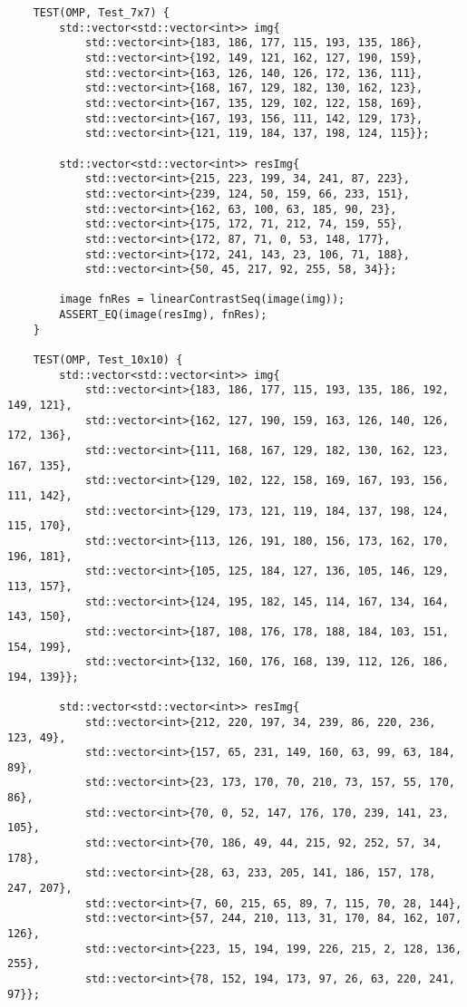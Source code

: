 \documentclass[14pt, russian]{extarticle}
\begin{document}
\begin{lstlisting}
	TEST(OMP, Test_7x7) {
		std::vector<std::vector<int>> img{
			std::vector<int>{183, 186, 177, 115, 193, 135, 186},
			std::vector<int>{192, 149, 121, 162, 127, 190, 159},
			std::vector<int>{163, 126, 140, 126, 172, 136, 111},
			std::vector<int>{168, 167, 129, 182, 130, 162, 123},
			std::vector<int>{167, 135, 129, 102, 122, 158, 169},
			std::vector<int>{167, 193, 156, 111, 142, 129, 173},
			std::vector<int>{121, 119, 184, 137, 198, 124, 115}};
		
		std::vector<std::vector<int>> resImg{
			std::vector<int>{215, 223, 199, 34, 241, 87, 223},
			std::vector<int>{239, 124, 50, 159, 66, 233, 151},
			std::vector<int>{162, 63, 100, 63, 185, 90, 23},
			std::vector<int>{175, 172, 71, 212, 74, 159, 55},
			std::vector<int>{172, 87, 71, 0, 53, 148, 177},
			std::vector<int>{172, 241, 143, 23, 106, 71, 188},
			std::vector<int>{50, 45, 217, 92, 255, 58, 34}};
		
		image fnRes = linearContrastSeq(image(img));
		ASSERT_EQ(image(resImg), fnRes);
	}
	
	TEST(OMP, Test_10x10) {
		std::vector<std::vector<int>> img{
			std::vector<int>{183, 186, 177, 115, 193, 135, 186, 192, 149, 121},
			std::vector<int>{162, 127, 190, 159, 163, 126, 140, 126, 172, 136},
			std::vector<int>{111, 168, 167, 129, 182, 130, 162, 123, 167, 135},
			std::vector<int>{129, 102, 122, 158, 169, 167, 193, 156, 111, 142},
			std::vector<int>{129, 173, 121, 119, 184, 137, 198, 124, 115, 170},
			std::vector<int>{113, 126, 191, 180, 156, 173, 162, 170, 196, 181},
			std::vector<int>{105, 125, 184, 127, 136, 105, 146, 129, 113, 157},
			std::vector<int>{124, 195, 182, 145, 114, 167, 134, 164, 143, 150},
			std::vector<int>{187, 108, 176, 178, 188, 184, 103, 151, 154, 199},
			std::vector<int>{132, 160, 176, 168, 139, 112, 126, 186, 194, 139}};
		
		std::vector<std::vector<int>> resImg{
			std::vector<int>{212, 220, 197, 34, 239, 86, 220, 236, 123, 49},
			std::vector<int>{157, 65, 231, 149, 160, 63, 99, 63, 184, 89},
			std::vector<int>{23, 173, 170, 70, 210, 73, 157, 55, 170, 86},
			std::vector<int>{70, 0, 52, 147, 176, 170, 239, 141, 23, 105},
			std::vector<int>{70, 186, 49, 44, 215, 92, 252, 57, 34, 178},
			std::vector<int>{28, 63, 233, 205, 141, 186, 157, 178, 247, 207},
			std::vector<int>{7, 60, 215, 65, 89, 7, 115, 70, 28, 144},
			std::vector<int>{57, 244, 210, 113, 31, 170, 84, 162, 107, 126},
			std::vector<int>{223, 15, 194, 199, 226, 215, 2, 128, 136, 255},
			std::vector<int>{78, 152, 194, 173, 97, 26, 63, 220, 241, 97}};
		

\end{lstlisting}
\end{document}
